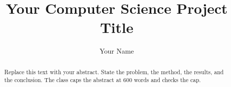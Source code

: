 \documentclass[bsc,citations=ieee,tables,glossary,12pt,a4paper]{bangor}
\title{Your Computer Science Project Title}
\author{Your Name}
\begin{document}
\maketitle
\statementspage


\begin{abstract}
Replace this text with your abstract. State the problem, the method,
the results, and the conclusion. The class caps the abstract at 600
words and checks the cap.
\end{abstract}

\tables
\printabbrevs








\printbibliography

\appendix

\end{document}
